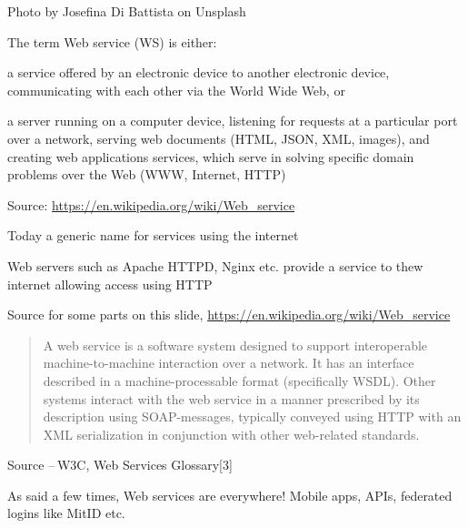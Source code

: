 \documentclass[Screen16to9,17pt]{foils}
\begin{document}


Photo by Josefina Di Battista on Unsplash



  The term Web service (WS) is either:
  \begin{list2}
  \item  a service offered by an electronic device to another electronic device, communicating with each other via the World Wide Web, or
  \item a server running on a computer device, listening for requests at a particular port over a network, serving web documents (HTML, JSON, XML, images), and creating web applications services, which serve in solving specific domain problems over the Web (WWW, Internet, HTTP)
\end{list2}
Source: \url{https://en.wikipedia.org/wiki/Web_service}

\begin{list2}
\item Today a generic name for services using the internet
\item Web servers such as Apache HTTPD, Nginx etc. provide a service to thew internet allowing access using HTTP
\item Source for some parts on this slide, \url{https://en.wikipedia.org/wiki/Web_service}
\end{list2}





\begin{quote}
A web service is a software system designed to support interoperable machine-to-machine interaction over a network. It has an interface described in a machine-processable format (specifically WSDL). Other systems interact with the web service in a manner prescribed by its description using SOAP-messages, typically conveyed using HTTP with an XML serialization in conjunction with other web-related standards.
\end{quote}
Source -- W3C, Web Services Glossary[3]

As said a few times, Web services are everywhere! Mobile apps, APIs, federated logins like MitID etc.


\end{document}
